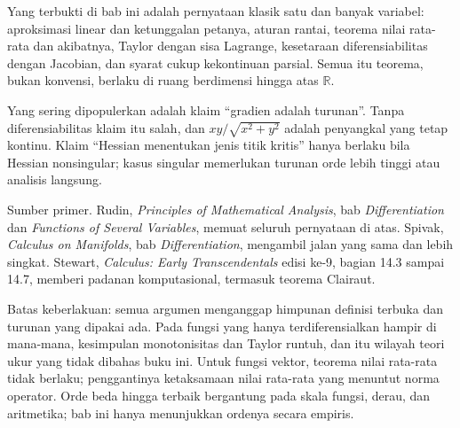 \begin{untukpeneliti}
Yang terbukti di bab ini adalah pernyataan klasik satu dan banyak variabel: aproksimasi
linear dan ketunggalan petanya, aturan rantai, teorema nilai rata-rata dan akibatnya, Taylor
dengan sisa Lagrange, kesetaraan diferensiabilitas dengan Jacobian, dan syarat cukup
kekontinuan parsial. Semua itu teorema, bukan konvensi, berlaku di ruang berdimensi hingga
atas $\mathbb{R}$.

Yang sering dipopulerkan adalah klaim ``gradien adalah turunan''. Tanpa diferensiabilitas
klaim itu salah, dan $xy/\sqrt{x^{2}+y^{2}}$ adalah penyangkal yang tetap kontinu. Klaim
``Hessian menentukan jenis titik kritis'' hanya berlaku bila Hessian nonsingular; kasus
singular memerlukan turunan orde lebih tinggi atau analisis langsung.

Sumber primer. Rudin, \emph{Principles of Mathematical Analysis}, bab
\emph{Differentiation} dan \emph{Functions of Several Variables}, memuat seluruh pernyataan
di atas. Spivak, \emph{Calculus on Manifolds}, bab \emph{Differentiation}, mengambil jalan
yang sama dan lebih singkat. Stewart, \emph{Calculus: Early Transcendentals} edisi ke-9,
bagian 14.3 sampai 14.7, memberi padanan komputasional, termasuk teorema Clairaut.

Batas keberlakuan: semua argumen menganggap himpunan definisi terbuka dan turunan yang
dipakai ada. Pada fungsi yang hanya terdiferensialkan hampir di mana-mana, kesimpulan
monotonisitas dan Taylor runtuh, dan itu wilayah teori ukur yang tidak dibahas buku ini.
Untuk fungsi vektor, teorema nilai rata-rata tidak berlaku; penggantinya ketaksamaan nilai
rata-rata yang menuntut norma operator. Orde beda hingga terbaik bergantung pada skala
fungsi, derau, dan aritmetika; bab ini hanya menunjukkan ordenya secara empiris.
\end{untukpeneliti}

